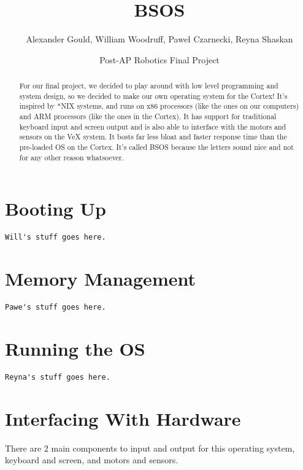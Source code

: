 \documentclass[english]{article}
\begin{document}
\title{BSOS}


\author{Alexander Gould, William Woodruff, Pawe\l{} Czarnecki, Reyna Shaskan}


\date{Post-AP Robotics Final Project}
\maketitle
\begin{abstract}
For our final project, we decided to play around with low level programming
and system design, so we decided to make our own operating system
for the Cortex! It's inspired by {*}NIX systems, and runs on x86 processors
(like the ones on our computers) and ARM processors (like the ones
in the Cortex). It has support for traditional keyboard input and
screen output and is also able to interface with the motors and sensors
on the VeX system. It bosts far less bloat and faster response time
than the pre-loaded OS on the Cortex. It's called BSOS because the
letters sound nice and not for any other reason whatsoever.
\end{abstract}

\part{Booting Up}

\begin{lstlisting}
Will's stuff goes here.
\end{lstlisting}



\part{Memory Management}

\begin{lstlisting}
Pawe's stuff goes here.
\end{lstlisting}



\part{Running the OS}

\begin{lstlisting}
Reyna's stuff goes here.
\end{lstlisting}



\part{Interfacing With Hardware}
There are 2 main components to input and output for this operating system, keyboard and screen, and motors and sensors.
\end{document}

